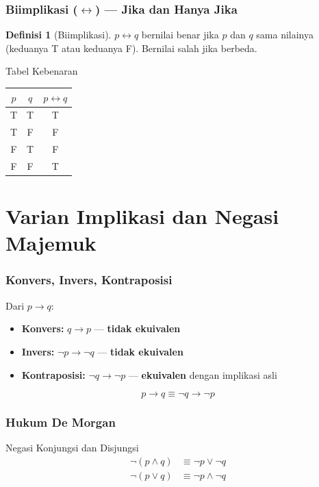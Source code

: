 \documentclass[handout]{beamer}
\theoremstyle{definition}
\newtheorem{definisi}[theorem]{Definisi}
\theoremstyle{example}
\begin{document}
\begin{frame}
\frametitle{Biimplikasi ($\leftrightarrow$) --- Jika dan Hanya Jika}
\begin{definisi}[Biimplikasi]
$p \leftrightarrow q$ bernilai benar jika $p$ dan $q$ sama nilainya (keduanya T atau keduanya F). Bernilai salah jika berbeda.
\end{definisi}
\begin{block}{Tabel Kebenaran}
\begin{tabular}{|c|c|c|}
\hline
$p$ & $q$ & $p \leftrightarrow q$ \\ \hline
T & T & T \\ \hline
T & F & F \\ \hline
F & T & F \\ \hline
F & F & T \\ \hline
\end{tabular}
\end{block}
\end{frame}

\section{Varian Implikasi dan Negasi Majemuk}

\begin{frame}
\frametitle{Konvers, Invers, Kontraposisi}
\begin{block}{Dari $p \rightarrow q$:}
\begin{itemize}
  \item \textbf{Konvers:} $q \rightarrow p$ --- \textbf{tidak ekuivalen}
  \item \textbf{Invers:} $\neg p \rightarrow \neg q$ --- \textbf{tidak ekuivalen}
  \item \textbf{Kontraposisi:} $\neg q \rightarrow \neg p$ --- \textbf{ekuivalen} dengan implikasi asli
\end{itemize}
\end{block}
\[
p \rightarrow q \equiv \neg q \rightarrow \neg p
\]
\end{frame}

\begin{frame}
\frametitle{Hukum De Morgan}
\begin{block}{Negasi Konjungsi dan Disjungsi}
\begin{align*}
\neg(p \wedge q) &\equiv \neg p \vee \neg q \\
\neg(p \vee q) &\equiv \neg p \wedge \neg q
\end{align*}
\end{block}
\end{frame}
\end{document}
